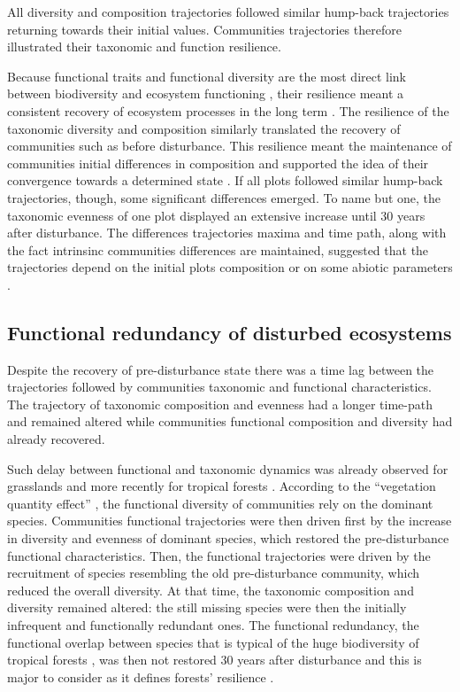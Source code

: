 \documentclass[fleqn,10pt]{ArtEcoFoG} %
\theoremstyle{definition}
\theoremstyle{definition}
\theoremstyle{definition}
\theoremstyle{remark}
\begin{document}
All diversity and composition trajectories followed similar hump-back
trajectories returning towards their initial values. Communities
trajectories therefore illustrated their taxonomic and function
resilience.

Because functional traits and functional diversity are the most direct
link between biodiversity and ecosystem functioning \citep{Diaz2005},
their resilience meant a consistent recovery of ecosystem processes in
the long term \citep{Guariguata2001}. The resilience of the taxonomic
diversity and composition similarly translated the recovery of
communities such as before disturbance. This resilience meant the
maintenance of communities initial differences in composition and
supported the idea of their convergence towards a determined state
\citep{Hubbell1999, Molino2001, Baraloto2012a}. If all plots followed
similar hump-back trajectories, though, some significant differences
emerged. To name but one, the taxonomic evenness of one plot displayed
an extensive increase until 30 years after disturbance. The differences
trajectories maxima and time path, along with the fact intrinsinc
communities differences are maintained, suggested that the trajectories
depend on the initial plots composition or on some abiotic parameters
\citep{Anderson2007}.

\subsection{Functional redundancy of disturbed
ecosystems}\label{functional-redundancy-of-disturbed-ecosystems}

Despite the recovery of pre-disturbance state there was a time lag
between the trajectories followed by communities taxonomic and
functional characteristics. The trajectory of taxonomic composition and
evenness had a longer time-path and remained altered while communities
functional composition and diversity had already recovered.

Such delay between functional and taxonomic dynamics was already
observed for grasslands \citep{Tilman1997, Mouillot2011} and more
recently for tropical forests \citep{Lohbeck2015, Guariguata2001}.
According to the ``vegetation quantity effect'' \citep{Grime1998}, the
functional diversity of communities rely on the dominant species.
Communities functional trajectories were then driven first by the
increase in diversity and evenness of dominant species, which restored
the pre-disturbance functional characteristics. Then, the functional
trajectories were driven by the recruitment of species resembling the
old pre-disturbance community, which reduced the overall diversity. At
that time, the taxonomic composition and diversity remained altered: the
still missing species were then the initially infrequent and
functionally redundant ones. The functional redundancy, the functional
overlap between species that is typical of the huge biodiversity of
tropical forests \citep{Bellwood2006}, was then not restored 30 years
after disturbance and this is major to consider as it defines forests'
resilience \citep{Trenbath1999, Elmqvist2003, Diaz2005}.
\end{document}
